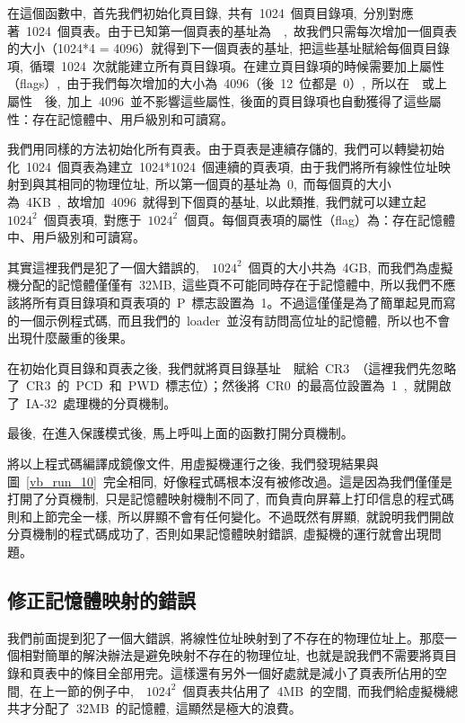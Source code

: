 在這個函數中,~首先我們初始化頁目錄,~共有~1024~個頁目錄項,~分別對應著~1024~個頁表。由于已知第一個頁表的基址為~~,~故我們只需每次增加一個頁表的大小（1024*4 = 4096）就得到下一個頁表的基址,~把這些基址賦給每個頁目錄項,~循環~1024~次就能建立所有頁目錄項。在建立頁目錄項的時候需要加上屬性（flags）,~由于我們每次增加的大小為~4096（後~12~位都是~0）,~所以在~~或上屬性~~後,~加上~4096~並不影響這些屬性,~後面的頁目錄項也自動獲得了這些屬性：存在記憶體中、用戶級別和可讀寫。

我們用同樣的方法初始化所有頁表。由于頁表是連續存儲的,~我們可以轉變初始化~1024~個頁表為建立~1024*1024~個連續的頁表項,~由于我們將所有線性位址映射到與其相同的物理位址,~所以第一個頁的基址為~0,~而每個頁的大小為~4KB~,~故增加~4096~就得到下個頁的基址,~以此類推,~我們就可以建立起~$1024^2$~個頁表項,~對應于~$1024^2$~個頁。每個頁表項的屬性（flag）為：存在記憶體中、用戶級別和可讀寫。

其實這裡我們是犯了一個大錯誤的,~~$1024^2$~個頁的大小共為~4GB,~而我們為虛擬機分配的記憶體僅僅有~32MB,~這些頁不可能同時存在于記憶體中,~所以我們不應該將所有頁目錄項和頁表項的~P~標志設置為~1。不過這僅僅是為了簡單起見而寫的一個示例程式碼,~而且我們的~loader~並沒有訪問高位址的記憶體,~所以也不會出現什麼嚴重的後果。

在初始化頁目錄和頁表之後,~我們就將頁目錄基址~~賦給~CR3~（這裡我們先忽略了~CR3~的~PCD~和~PWD~標志位）；然後將~CR0~的最高位設置為~1~,~就開啟了~IA-32~處理機的分頁機制。

最後,~在進入保護模式後,~馬上呼叫上面的函數打開分頁機制。


將以上程式碼編譯成鏡像文件,~用虛擬機運行之後,~我們發現結果與圖~\ref{vb_run_10}~完全相同,~好像程式碼根本沒有被修改過。這是因為我們僅僅是打開了分頁機制,~只是記憶體映射機制不同了,~而負責向屏幕上打印信息的程式碼則和上節完全一樣,~所以屏顯不會有任何變化。不過既然有屏顯,~就說明我們開啟分頁機制的程式碼成功了,~否則如果記憶體映射錯誤,~虛擬機的運行就會出現問題。

\subsection{修正記憶體映射的錯誤}

我們前面提到犯了一個大錯誤,~將線性位址映射到了不存在的物理位址上。那麼一個相對簡單的解決辦法是避免映射不存在的物理位址,~也就是說我們不需要將頁目錄和頁表中的條目全部用完。這樣還有另外一個好處就是減小了頁表所佔用的空間,~在上一節的例子中,~~$1024^2$~個頁表共佔用了~4MB~的空間,~而我們給虛擬機總共才分配了~32MB~的記憶體,~這顯然是極大的浪費。

